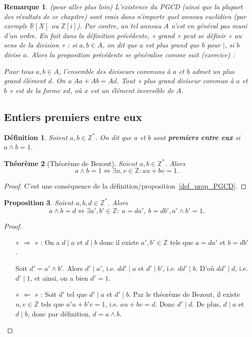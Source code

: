 \documentclass[10pt,a4paper]{report}
\newtheorem{thm}{Théorème}[chapter]
\newtheorem*{rem}{Remarque}
\newtheorem{Def}[thm]{Définition}
\newtheorem{Prop}[thm]{Proposition}
\newcommand{\R}{\mathbb{R}}
\newcommand{\Z}{\mathbb{Z}}
\begin{document}
\begin{rem}(pour aller plus loin) L'existence du PGCD (ainsi que la plupart des résultats de ce chapitre) sont vrais dans n'importe quel anneau euclidien (par exemple $\R[X]$ ou $\Z[i]$). Par contre, un tel anneau $A$ n'est en général pas muni d'un ordre. En fait dans la définition précédente, « grand » peut se définir « au sens de la division » : si $a,b\in A$, on dit que $a$ est plus grand que $b$ pour $|$, si $b$ divise $a$. Alors la proposition précédente se généralise comme suit (exercice) : 

Pour tous $a,b\in A$, l'ensemble des diviseurs communs à $a$ et $b$ admet un plus grand élément $d$. On a $Aa+Ab=A d$. Tout « plus grand diviseur commun à $a$ et $b $ » est de la forme $x d$, où $x$ est un élément inversible de $A$.

\end{rem}


\subsection{Entiers premiers entre eux}

\begin{Def}
Soient $a,b \in \mathbb{Z}^*$. On dit que $a$ et $b$ sont \textbf{premiers entre eux} si $a\wedge b=1$.
\end{Def}

\begin{thm}[Théorème de Bezout] Soient $a,b \in \mathbb{Z}^*$. Alors
$$  a\wedge b =1 \Longleftrightarrow \exists u,v \in \mathbb{Z}: au+bv=1.    $$
\end{thm}

\begin{proof}
C'est une conséquence de la définition/proposition~\ref{def_prop_PGCD}.
\end{proof}



\begin{Prop}
Soient $a,b,d \in \mathbb{Z}^*$. Alors 
$$  a\wedge b=d \Longleftrightarrow \exists a',b' \in \mathbb{Z}: \ a=da', \ b=db', a'\wedge b'=1 . $$
\end{Prop}

\begin{proof}
\begin{itemize}
\item[« $ \Rightarrow$ » : ] On a $d \mid a$ et $d \mid b$ donc il existe $ a',b' \in \mathbb{Z}
 $ tels que $a=da'$ et $b=db'$. \par 
 Soit $d'=a' \wedge b'$. Alors $d' \mid a'$, i.e. $dd'\mid a$ et $d'\mid b'$, i.e. $dd' \mid b$. D'où $dd'\mid d $, i.e. $d'\mid 1$, et ainsi, on a bien $d'=1$.
 \item[« $\Leftarrow$ » : ] Soit $d'$ tel que $d'\mid a$ et $d'\mid b$. Par le théorème de Bezout, il existe  $u,v \in \mathbb{Z}$ tels que $a'u+b'v=1$, i.e. $au+bv=d$. Donc $d'\mid d$. De plus, $d \mid a$ et $d \mid b$, donc par définition, $d=a\wedge b$.  
\end{itemize}
\end{proof}
\end{document}
